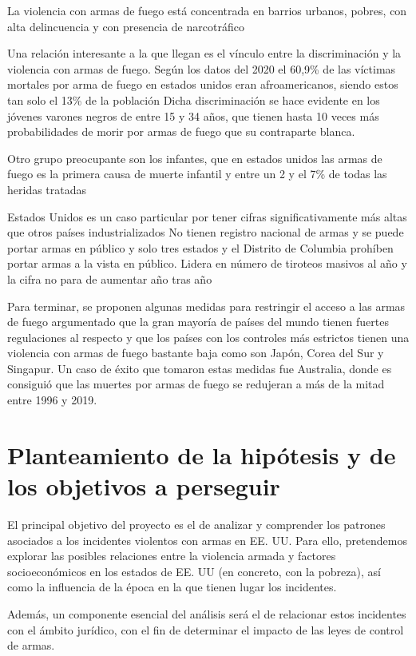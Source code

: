 \documentclass[11pt,a4paper]{article}
\begin{document}
La violencia con armas de fuego está concentrada en barrios urbanos, pobres, con alta delincuencia y con presencia de narcotráfico 

Una relación interesante a la que llegan es el vínculo entre la discriminación y la violencia con armas de fuego. Según los datos del 2020 el 60,9\% de las víctimas mortales por arma de fuego en estados unidos eran afroamericanos, siendo estos tan solo el 13\% de la población  Dicha discriminación se hace evidente en los jóvenes varones negros de entre 15 y 34 años, que tienen hasta 10 veces más probabilidades de morir por armas de fuego que su contraparte blanca. 

Otro grupo preocupante son los infantes, que en estados unidos las armas de fuego es la primera causa de muerte infantil y entre un 2 y el 7\% de todas las heridas tratadas 

Estados Unidos es un caso particular por tener cifras significativamente más altas que otros países industrializados  No tienen registro nacional de armas y se puede portar armas en público y solo tres estados y el Distrito de Columbia prohíben portar armas a la vista en público. Lidera en número de tiroteos masivos al año y la cifra no para de aumentar año tras año 

Para terminar, se proponen algunas medidas para restringir el acceso a las armas de fuego argumentado que la gran mayoría de países del mundo tienen fuertes regulaciones al respecto y que los países con los controles más estrictos tienen una violencia con armas de fuego bastante baja como son Japón, Corea del Sur y Singapur.  Un caso de éxito que tomaron estas medidas fue Australia, donde es consiguió que las muertes por armas de fuego se redujeran a más de la mitad entre 1996 y 2019. 

\section{Planteamiento de la hipótesis y de los objetivos a perseguir}

El principal objetivo del proyecto es el de analizar y comprender los patrones asociados a los incidentes violentos con armas en EE. UU. Para ello, pretendemos explorar las posibles relaciones entre la violencia armada y factores socioeconómicos en los estados de EE. UU (en concreto, con la pobreza), así como la influencia de la época en la que tienen lugar los incidentes.

Además, un componente esencial del análisis será el de relacionar estos incidentes con el ámbito jurídico, con el fin de determinar el impacto de las leyes de control de armas.
\end{document}
